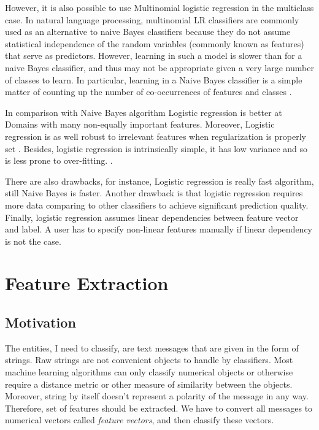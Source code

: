 \documentclass[12pt]{report}
\begin{document}
However, it is also possible to use Multinomial logistic regression in the multiclass case. In natural language processing, multinomial LR classifiers are commonly used as an alternative to naive Bayes classifiers because they do not assume statistical independence of the random variables (commonly known as features) that serve as predictors. However, learning in such a model is slower than for a naive Bayes classifier, and thus may not be appropriate given a very large number of classes to learn. In particular, learning in a Naive Bayes classifier is a simple matter of counting up the number of co-occurrences of features and classes \cite{Bishop}.

In comparison with Naive Bayes algorithm Logistic regression is better at Domains with many non-equally important features. Moreover, Logistic regression is as well robust to irrelevant features when regularization is properly set \cite{kevinPMuprhy}. Besides, logistic regression is intrinsically simple, it has low variance and so is less prone to over-fitting. .

There are also drawbacks, for instance, Logistic regression is really fast algorithm, still Naive Bayes is faster. Another drawback is that logistic regression requires more data comparing to other classifiers to achieve significant prediction quality. Finally, logistic regression assumes linear dependencies between feature vector and label. A user has to specify non-linear features manually if linear dependency is not the case.


\newpage

\chapter{Feature Extraction}

\section{Motivation}

The entities, I need to classify, are text messages that are given in the form of strings. Raw strings are not convenient objects to handle by classifiers. Most machine learning algorithms can only classify numerical objects or otherwise require a distance metric or other measure of similarity between the objects. Moreover, string by itself doesn't represent a polarity of the message in any way. Therefore, set of features should be extracted. We have to convert all messages to numerical vectors called \textit{feature vectors}, and then classify these vectors.
\end{document}
